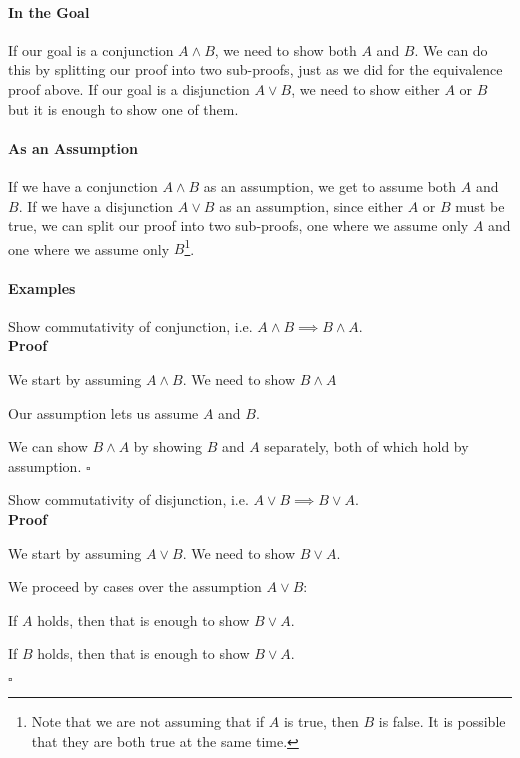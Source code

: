 \documentclass{tufte-handout}
\begin{document}
\paragraph{In the Goal}
If our goal is a conjunction $A \land B$, we need to show both $A$
and $B$. We can do this by splitting our proof into two
sub-proofs, just as we did for the equivalence proof above.
%
If our goal is a disjunction $A \lor B$, we need to show either
$A$ or $B$ but it is enough to show one of them.

\paragraph{As an Assumption}
If we have a conjunction $A \land B$ as an assumption, we get to
assume both $A$ and $B$. If we have a disjunction $A \lor B$ as an
assumption, since either $A$ or $B$ must be true, we can split our
proof into two sub-proofs, one where we assume only $A$ and one
where we assume only $B$\footnote{Note that we are not assuming
  that if $A$ is true, then $B$ is false. It is possible that they
  are both true at the same time. }.


\paragraph{Examples}

\begin{itemize}
\item Show commutativity of conjunction, i.e. $A \land B \implies B \land A$.\\
  \textbf{Proof}
  \begin{compactenum}
  \item We start by assuming $A \land B$. We need to show $B \land A$
  \item Our assumption lets us assume $A$ and $B$.
  \item We can show $B \land A$ by showing $B$ and $A$ separately,
    both of which hold by assumption. $\square$
  \end{compactenum}
\item Show commutativity of disjunction, i.e. $A \lor B \implies B \lor A$.\\
  \textbf{Proof}
  \begin{compactenum}
  \item We start by assuming $A \lor B$. We need to show $B \lor A$.
  \item We proceed by cases over the assumption $A \lor B$:
    \begin{compactenum}
    \item If $A$ holds, then that is enough to show $B \lor A$.
    \item If $B$ holds, then that is enough to show $B \lor A$.
    \end{compactenum}
  \end{compactenum}
  $\square$
\end{itemize}
\end{document}

